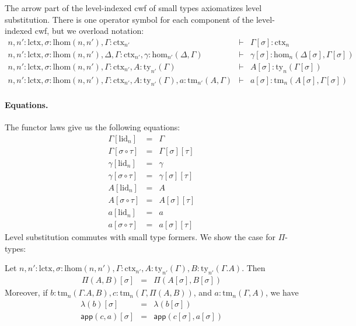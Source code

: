 \documentclass[11pt,a4paper]{article}
\theoremstyle{plain}
\theoremstyle{definition}
\newcommand{\app}[2]{{#1\,#2}} %
\def\lhom{\mathrm{lhom}}
\def\sub{\mathrm{hom}}
\def\lctx{\mathrm{lctx}}
\def\lid{\mathrm{lid}}
\newcommand{\ctx}{\mathrm{ctx}}
\newcommand{\ty}{\mathrm{ty}}
\newcommand{\tm}{\mathrm{tm}}
\def\app{\mathsf{app}}
\begin{document}
The arrow part of the level-indexed cwf of small types axiomatizes level substitution. There is one operator symbol for each component of the level-indexed cwf, but we overload notation:
\begin{eqnarray*}
n, n' : \lctx , \sigma : \lhom(n,n'), \Gamma : \ctx_{n'} &\vdash&
\Gamma[\sigma] : \ctx_n\\
n, n' : \lctx , \sigma : \lhom(n,n'), \Delta,\Gamma : \ctx_{n'}, \gamma : \sub_{n'}(\Delta,\Gamma)
&\vdash&
\gamma[\sigma] : \sub_{n}(\Delta[\sigma],\Gamma[\sigma]) \\
n, n' : \lctx , \sigma : \lhom(n,n'), \Gamma : \ctx_{n'}, A:\ty_{n'}(\Gamma)
&\vdash&
A[\sigma]: \ty_n(\Gamma[\sigma])\\
n,n' : \lctx , \sigma : \lhom(n,n'), \Gamma : \ctx_{n'}, A:\ty_{n'}(\Gamma), a : \tm_{n'}(A,\Gamma)
&\vdash&
a[\sigma] : \tm_{n}(A[\sigma],\Gamma[\sigma])
\end{eqnarray*}
\paragraph{Equations.}
The functor laws give us the following equations:
\begin{eqnarray*}
\Gamma[\lid_n] &=& \Gamma\\
\Gamma[\sigma \circ \tau] &=& \Gamma[\sigma][\tau]\\
\gamma[\lid_n] &=& \gamma\\
\gamma[\sigma \circ \tau] &=& \gamma[\sigma][\tau]\\
A[\lid_n] &=& A\\
A[\sigma \circ \tau] &=& A[\sigma][\tau]%
\\
a[\lid_n] &=& a\\
a[\sigma \circ \tau] &=& a[\sigma][\tau]%
\end{eqnarray*}
Level substitution commutes with small type formers. We show the case for $\Pi$-types:

Let $n, n' : \lctx , \sigma : \lhom(n,n'), \Gamma : \ctx_{n'}, A:\ty_{n'}(\Gamma), B:\ty_{n'}(\Gamma.A)$. Then
\begin{eqnarray*}
\Pi(A,B)[\sigma] &=& \Pi(A[\sigma],B[\sigma])
\end{eqnarray*}
Moreover, if $b : \tm_n(\Gamma.A,B), c :  \tm_n(\Gamma,\Pi(A,B))$,  and $a : \tm_n(\Gamma,A)$, we have
\begin{eqnarray*}
\lambda(b)[\sigma] &=&\lambda(b[\sigma])\\
\app(c,a)[\sigma] &=&\app(c[\sigma],a[\sigma])
\end{eqnarray*}
\end{document}
